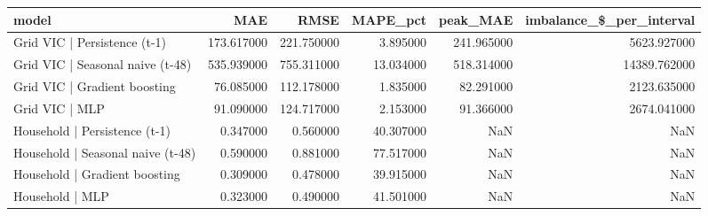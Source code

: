 \begin{tabular}{lrrrrr}
\toprule
model & MAE & RMSE & MAPE\_pct & peak\_MAE & imbalance\_\$\_per\_interval \\
\midrule
Grid VIC | Persistence (t-1) & 173.617000 & 221.750000 & 3.895000 & 241.965000 & 5623.927000 \\
Grid VIC | Seasonal naive (t-48) & 535.939000 & 755.311000 & 13.034000 & 518.314000 & 14389.762000 \\
Grid VIC | Gradient boosting & 76.085000 & 112.178000 & 1.835000 & 82.291000 & 2123.635000 \\
Grid VIC | MLP & 91.090000 & 124.717000 & 2.153000 & 91.366000 & 2674.041000 \\
Household | Persistence (t-1) & 0.347000 & 0.560000 & 40.307000 & NaN & NaN \\
Household | Seasonal naive (t-48) & 0.590000 & 0.881000 & 77.517000 & NaN & NaN \\
Household | Gradient boosting & 0.309000 & 0.478000 & 39.915000 & NaN & NaN \\
Household | MLP & 0.323000 & 0.490000 & 41.501000 & NaN & NaN \\
\bottomrule
\end{tabular}

